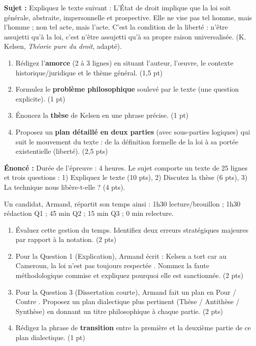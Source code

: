 \documentclass[11pt]{article}
\begin{document}
\begin{exercice}
\textbf{Sujet :} Expliquez le texte suivant : \og L'État de droit implique que la loi soit générale, abstraite, impersonnelle et prospective. Elle ne vise pas tel homme, mais l'homme ; non tel acte, mais l'acte. C'est la condition de la liberté : n'être assujetti qu'à la loi, c'est n'être assujetti qu'à sa propre raison universalisée. \fg (K. Kelsen, \textit{Théorie pure du droit}, adapté).

\begin{enumerate}
    \item Rédigez l'\textbf{amorce} (2 à 3 lignes) en situant l'auteur, l'œuvre, le contexte historique/juridique et le thème général. (1,5 pt)
    \item Formulez le \textbf{problème philosophique} soulevé par le texte (une question explicite). (1 pt)
    \item Énoncez la \textbf{thèse} de Kelsen en une phrase précise. (1 pt)
    \item Proposez un \textbf{plan détaillé en deux parties} (avec sous-parties logiques) qui suit le mouvement du texte : de la définition formelle de la loi à sa portée existentielle (liberté). (2,5 pts)
\end{enumerate}
\end{exercice}

\begin{exercice}
\textbf{Énoncé :} Durée de l'épreuve : 4 heures. Le sujet comporte un texte de 25 lignes et trois questions : 1) Expliquez le texte (10 pts), 2) Discutez la thèse (6 pts), 3) \og La technique nous libère-t-elle ? \fg (4 pts).

Un candidat, Armand, répartit son temps ainsi : 1h30 lecture/brouillon ; 1h30 rédaction Q1 ; 45 min Q2 ; 15 min Q3 ; 0 min relecture.

\begin{enumerate}
    \item Évaluez cette gestion du temps. Identifiez deux erreurs stratégiques majeures par rapport à la notation. (2 pts)
    \item Pour la Question 1 (Explication), Armand écrit : \og Kelsen a tort car au Cameroun, la loi n'est pas toujours respectée \fg. Nommez la faute méthodologique commise et expliquez pourquoi elle est sanctionnée. (2 pts)
    \item Pour la Question 3 (Dissertation courte), Armand fait un plan en \og Pour / Contre \fg. Proposez un plan dialectique plus pertinent (Thèse / Antithèse / Synthèse) en donnant un titre philosophique à chaque partie. (2 pts)
    \item Rédigez la phrase de \textbf{transition} entre la première et la deuxième partie de ce plan dialectique. (1 pt)
\end{enumerate}
\end{exercice}
\end{document}
